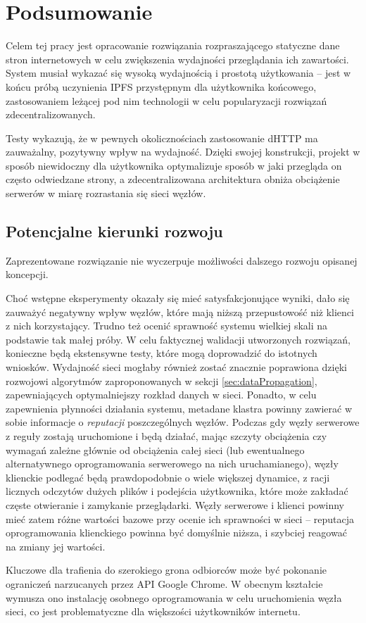 \chapter{Podsumowanie}
\label{cha:summary}

Celem tej pracy jest opracowanie rozwiązania rozpraszającego statyczne dane stron internetowych w celu zwiększenia wydajności przeglądania ich zawartości. System musiał wykazać się wysoką wydajnością i prostotą użytkowania -- jest w końcu próbą uczynienia IPFS przystępnym dla użytkownika końcowego, zastosowaniem leżącej pod nim technologii w celu popularyzacji rozwiązań zdecentralizowanych.

Testy wykazują, że w pewnych okolicznościach zastosowanie dHTTP ma zauważalny, pozytywny wpływ na wydajność. Dzięki swojej konstrukcji, projekt w sposób niewidoczny dla użytkownika optymalizuje sposób w jaki przegląda on często odwiedzane strony, a zdecentralizowana architektura obniża obciążenie serwerów w miarę rozrastania się sieci węzłów.

\section{Potencjalne kierunki rozwoju}
\label{sec:future}

Zaprezentowane rozwiązanie nie wyczerpuje możliwości dalszego rozwoju opisanej koncepcji.

Choć wstępne eksperymenty okazały się mieć satysfakcjonujące wyniki, dało się zauważyć negatywny wpływ węzłów, które mają niższą przepustowość niż klienci z nich korzystający. Trudno też ocenić sprawność systemu wielkiej skali na podstawie tak małej próby. W celu faktycznej walidacji utworzonych rozwiązań, konieczne będą ekstensywne testy, które mogą doprowadzić do istotnych wniosków. Wydajność sieci mogłaby również zostać znacznie poprawiona dzięki rozwojowi algorytmów zaproponowanych w sekcji \ref{sec:dataPropagation}, zapewniających optymalniejszy rozkład danych w sieci. Ponadto, w celu zapewnienia płynności działania systemu, metadane klastra powinny zawierać w sobie informacje o {\em reputacji} poszczególnych węzłów. Podczas gdy węzły serwerowe z reguły zostają uruchomione i będą działać, mając szczyty obciążenia czy wymagań zależne głównie od obciążenia całej sieci (lub ewentualnego alternatywnego oprogramowania serwerowego na nich uruchamianego), węzły klienckie podlegać będą prawdopodobnie o wiele większej dynamice, z racji licznych odczytów dużych plików i podejścia użytkownika, które może zakładać częste otwieranie i zamykanie przeglądarki. Węzły serwerowe i klienci powinny mieć zatem różne wartości bazowe przy ocenie ich sprawności w sieci -- reputacja oprogramowania klienckiego powinna być domyślnie niższa, i szybciej reagować na zmiany jej wartości.

Kluczowe dla trafienia do szerokiego grona odbiorców może być pokonanie ograniczeń narzucanych przez API Google Chrome. W obecnym kształcie wymusza ono instalację osobnego oprogramowania w celu uruchomienia węzła sieci, co jest problematyczne dla większości użytkowników internetu.